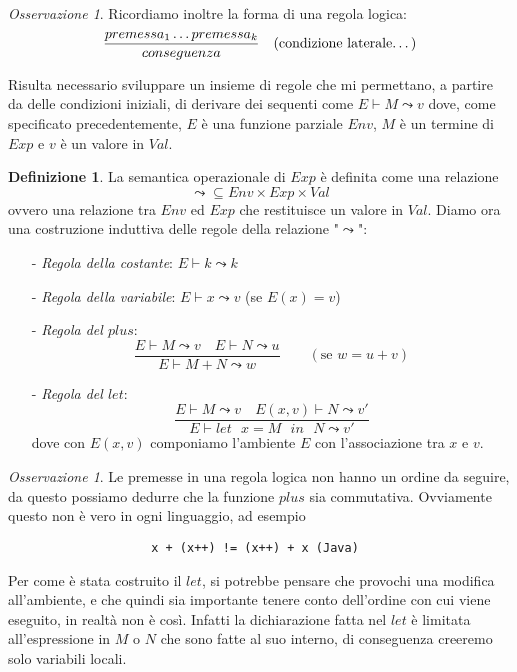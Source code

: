 \documentclass{article}
\theoremstyle{definition}
\theoremstyle{definition}
\theoremstyle{definition}
\newtheorem{definition}[theorem]{Definizione}
\theoremstyle{remark}
\newtheorem{remark}[theorem]{Osservazione}
\begin{document}
\begin{remark}
    Ricordiamo inoltre la forma di una regola logica:
    $$\frac{premessa_1\dots premessa_k}{ conseguenza}\quad(\text{condizione laterale\dots})$$
\end{remark}
Risulta necessario sviluppare un insieme di regole che mi permettano, a partire da delle condizioni iniziali, di derivare
dei sequenti come $E\vdash M \leadsto v$ dove, come specificato precedentemente, $E$ è una funzione parziale $Env$, $M$ è un termine di $Exp$
e $v$ è un valore in $Val$.
\begin{definition}La semantica operazionale di $Exp$ è definita come una relazione
    $$\leadsto  \subseteq Env\times Exp\times Val$$
    ovvero una relazione tra $Env$ ed $Exp$ che restituisce un valore in $Val$. Diamo ora una costruzione induttiva
    delle regole della  relazione "$\leadsto$":
    \begin{itemize}
        \item [-] \textit{Regola della costante}: $E\vdash k\leadsto k$
        \item [-] \textit{Regola della variabile}: $E\vdash x \leadsto v$ (se $E(x)= v$)
        \item [-] \textit{Regola del $plus$}: $$\frac{E\vdash M\leadsto v \quad E\vdash N\leadsto u} {E\vdash M+N\leadsto w}\qquad(\text{se $w = u+v$})$$
        \item [-] \textit{Regola del $let$}: $$\frac{E\vdash M\leadsto v \quad E(x,v)\vdash N\leadsto v'}{E\vdash \text{$let$ $x=M$ $in$ $N$}\leadsto v'}$$
              dove con $E(x,v)$ componiamo l'ambiente $E$ con l'associazione tra $x$ e $v$.
    \end{itemize}
\end{definition}
\begin{remark}
    Le premesse in una regola logica non hanno un ordine da seguire, da questo possiamo dedurre
    che la funzione $plus$ sia commutativa. Ovviamente questo non è  vero in ogni linguaggio, ad esempio
    \begin{verbatim}                    x + (x++) != (x++) + x (Java)\end{verbatim}
    Per come è stata costruito il $let$, si potrebbe pensare che provochi una modifica all'ambiente,
    e che quindi sia importante tenere conto dell'ordine con cui viene eseguito, in realtà non è così.
    Infatti la dichiarazione  fatta nel $let$ è limitata all'espressione in $M$ o $N$ che
    sono fatte al suo interno, di conseguenza creeremo solo variabili locali.
\end{remark}
\end{document}
